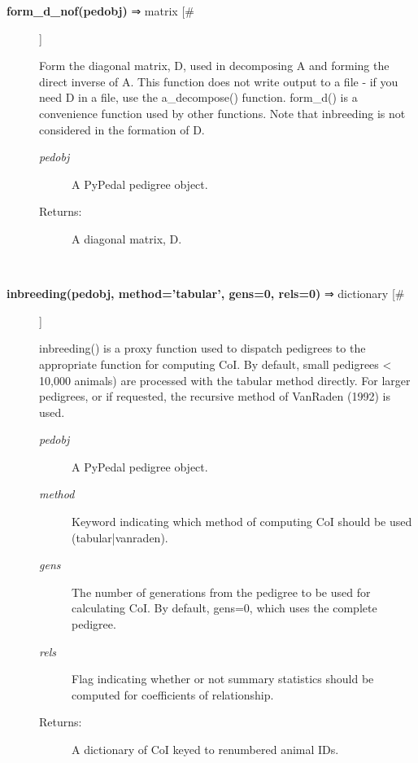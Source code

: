 \documentclass{article}
\begin{document}
\begin{description}
\item[\textbf{form\_d\_nof(pedobj)} ⇒ matrix [\#]
]
\par Form the diagonal matrix, D, used in decomposing A and forming the direct
inverse of A.  This function does not write output to a file - if you need D in
a file, use the a\_decompose()  function.  form\_d() is a convenience function
used by other functions.  Note that inbreeding is not considered in the
formation of D.
\begin{description}
\item[\textit{pedobj}
]
A PyPedal pedigree object.
\item[Returns:
]
A diagonal matrix, D.
\end{description}\\

\item[\textbf{inbreeding(pedobj, method='tabular', gens=0, rels=0)} ⇒ dictionary [\#]
]
\par inbreeding() is a proxy function used to dispatch pedigrees to the appropriate
function for computing CoI.  By default, small pedigrees < 10,000 animals) are
processed with the tabular method directly.  For larger pedigrees, or if requested,
the recursive method of VanRaden (1992) is used.
\begin{description}
\item[\textit{pedobj}
]
A PyPedal pedigree object.
\item[\textit{method}
]
Keyword indicating which method of computing CoI should be used (tabular|vanraden).
\item[\textit{gens}
]
The number of generations from the pedigree to be used for calculating CoI.  By default, gens=0, which uses the complete pedigree.
\item[\textit{rels}
]
Flag indicating whether or not summary statistics should be computed for coefficients of relationship.
\item[Returns:
]
A dictionary of CoI keyed to renumbered animal IDs.
\end{description}\\


\end{description}
\end{document}
